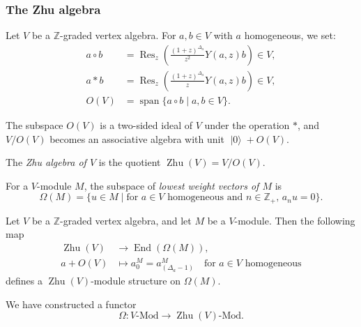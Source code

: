 \documentclass{beamer}
\DeclareMathOperator{\End}{End}
\DeclareMathOperator{\vspan}{span}
\DeclareMathOperator{\Res}{Res}
\DeclareMathOperator{\vac}{|0\rangle}
\DeclareMathOperator{\Zhu}{Zhu}
\begin{document}
\begin{frame}
  \frametitle{The Zhu algebra}

  Let $V$ be a $\mathbb{Z}$-graded vertex algebra.
  For $a, b \in V$ with $a$ homogeneous, we set:
  \begin{align*}
    a\circ b &= \Res_z\left(\frac{(1 + z)^{\Delta_a}}{z^2}Y(a, z)b\right) \in V, \\
    a*b &= \Res_z\left(\frac{(1 + z)^{\Delta_a}}{z}Y(a, z)b\right) \in V, \\
    O(V) &= \vspan\{a\circ b \mid a, b \in V\}.
  \end{align*}

  \begin{theorem}
    \label{thr:5}
    The subspace $O(V)$ is a two-sided ideal of $V$ under the operation $*$, and $V/O(V)$ becomes an associative algebra with unit $\vac + O(V)$.
  \end{theorem}

  The \emph{Zhu algebra of $V$} is the quotient $\Zhu(V) = V/O(V)$.

\end{frame}

\begin{frame}

  For a $V$-module $M$, the subspace of \emph{lowest weight vectors of $M$} is
  \begin{equation*}
    \Omega(M) = \{u \in M \mid \text{for $a \in V$ homogeneous and $n \in \mathbb{Z}_+$, $a_nu = 0$}\}.
  \end{equation*}

  \begin{theorem}
    \label{thr:6}
    Let $V$ be a $\mathbb{Z}$-graded vertex algebra, and let $M$ be a $V$-module.
    Then the following map
    \begin{align*}
      \Zhu(V) &\to \End(\Omega(M)), \\
      a + O(V) &\mapsto a^M_0 = a^M_{(\Delta_a - 1)} \quad \text{for $a \in V$ homogeneous}
    \end{align*}
    defines a $\Zhu(V)$-module structure on $\Omega(M)$.
  \end{theorem}

  We have constructed a functor
  \begin{equation*}
    \Omega: \text{$V$-Mod} \to \text{$\Zhu(V)$-Mod}.
  \end{equation*}

\end{frame}
\end{document}
